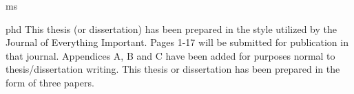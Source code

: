 \documentclass[times,12pt,titlepage]{mstthesis}
\begin{document}

\begin{ThesisTitlePage}{ms}

\author{\MakeUppercase{I. M. Author}}






\memberfive{}


\end{ThesisTitlePage}




\begin{ThesisPublicationOption}{phd}
  This thesis (or dissertation) has been prepared in the style
  utilized by the Journal of Everything Important.  Pages 1-17 will be
  submitted for publication in that journal.  Appendices A, B and C
  have been added for purposes normal to thesis/dissertation writing.
  This thesis or dissertation has been prepared in the form of three
  papers.
\end{ThesisPublicationOption}


\begin{ThesisAbstract}
\lipsum[1]
\end{ThesisAbstract}


\begin{ThesisAcknowledgment}
\lipsum[2]
\end{ThesisAcknowledgment}

\begin{ThesisFrontMatter}
\tableofcontents
\listoffigures
\listoftables
\end{ThesisFrontMatter}
\end{document}
